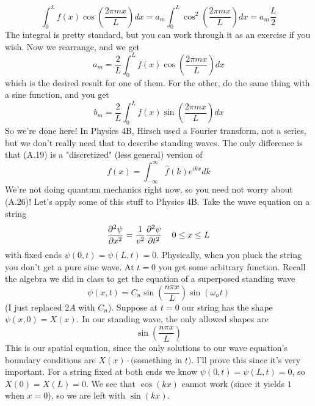\documentclass{report}
\numberwithin{equation}{section}
\begin{document}
\begin{equation}
	\int^L_0f(x)\cos\left(\frac{2\pi mx}{L}\right)dx = a_m\int^L_0\cos^2\left(\frac{2\pi mx}{L}\right)dx = a_m\frac{L}{2}
\end{equation}
The integral is pretty standard, but you can work through it as an exercise if you wish. Now we rearrange, and we get
\begin{equation*}
	a_m = \frac{2}{L}\int_0^L f(x)\cos\left(\frac{2\pi mx}{L}\right)dx
\end{equation*}
which is the desired result for one of them. For the other, do the same thing with a sine function, and you get
\begin{equation*}
	b_m = \frac{2}{L}\int_0^L f(x)\sin\left(\frac{2\pi mx}{L}\right)dx
\end{equation*}
So we're done here! In Physics 4B, Hirsch used a Fourier transform, not a series, but we don't really need that to describe standing waves. The only difference is that (A.19) is a "discretized" (less general) version of
\begin{equation}
	f(x) =\int^{\infty}_{-\infty}\hat{f}(k)e^{ikx}dk
\end{equation}
We're not doing quantum mechanics right now, so you need not worry about (A.26)! Let's apply some of this stuff to Physics 4B. Take the wave equation on a string
\begin{equation}
	\frac{\partial^2\psi}{\partial x^2} = \frac{1}{v^2}\frac{\partial^2\psi}{\partial t^2} \hspace{0.4cm} 0\leq x\leq L
\end{equation}
with fixed ends $\psi(0,t) = \psi(L,t) =0$. Physically, when you pluck the string you don't get a pure sine wave. At $t=0$ you get some arbitrary function. Recall the algebra we did in class to get the equation of a superposed standing wave
\begin{equation}
	\psi(x,t) = C_n\sin\left(\frac{n\pi x}{L}\right)\sin(\omega_n t)
\end{equation}
(I just replaced $2A$ with $C_n$). Suppose at $t=0$ our string has the shape $\psi(x,0) = X(x)$. In our standing wave, the only allowed shapes are
\begin{equation}
	\sin\left(\frac{n\pi x}{L}\right)
\end{equation}
This is our spatial equation, since the only solutions to our wave equation's boundary conditions are $X(x)\cdot ($something in $t)$. I'll prove this since it's very important. For a string fixed at both ends we know $\psi(0,t) = \psi(L,t) =0$, so $X(0) = X(L) = 0$. We see that $\cos(kx)$ cannot work (since it yields $1$ when $x=0$), so we are left with $\sin(kx)$.
\end{document}
